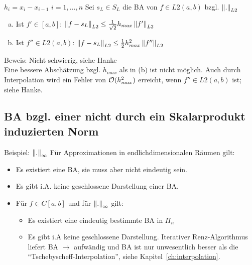 $h_i = x_i - x_{i-1}\,\,i=1,\ldots,n$
 Sei $s_L \in S_L$ die BA von $f \in L2(a,b)$ bzgl. $\left\lVert . \right\rVert_{L2}$
\begin{enumerate}[(a)]
  \item Ist $f' \in [a,b]$: $\left\lVert f-s_L \right\rVert_{L2} \leq \frac{1}{\sqrt{2}} h_{max} \left\lVert f' \right\rVert_{L2}$
  \item Ist $f'' \in L2(a,b)$: $\left\lVert f-s_L \right\rVert_{L2} \leq \frac{1}{2} h^2_{max} \left\lVert f'' \right\rVert_{L2}$
\end{enumerate}
Beweis: Nicht schwierig, siehe Hanke\\
Eine bessere Abschätzung bzgl. $h_{max}$ als in (b) ist nicht möglich.
Auch durch Interpolation wird ein Fehler von $\mathcal{O}(h^2_{max})$ erreicht,
wenn $f'' \in L2(a,b)$ ist; siehe Hanke.

\subsection{BA bzgl. einer nicht durch ein Skalarprodukt induzierten Norm}
Beispiel: $\left\lVert . \right\rVert_\infty$
Für Approximationen in endlichdimensionalen Räumen gilt:
\begin{itemize}
  \item Es existiert eine BA, sie muss aber nicht eindeutig sein.
  \item Es gibt i.A. keine geschlossene Darstellung einer BA.
  \item Für $f \in C[a,b]$ und für $\left\lVert . \right\rVert_\infty$ gilt:
    \begin{itemize}
      \item Es existiert eine eindeutig bestimmte BA in $\Pi_n$
      \item Es gibt i.A keine geschlossene Darstellung. Iterativer Renz-Algorithmus liefert BA
        $\rightarrow$ aufwändig und BA ist nur unwesentlich besser als die ``Tschebyscheff-Interpolation'',
        siehe Kapitel~\ref{ch:interpolation}.
    \end{itemize}
\end{itemize}
